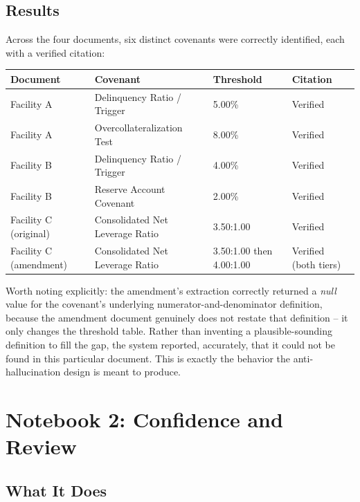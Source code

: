\documentclass[11pt,a4paper]{article}
\begin{document}
\subsection{Results}

Across the four documents, six distinct covenants were correctly identified, each with a verified citation:

\begin{center}
\renewcommand{\arraystretch}{1.3}
\begin{tabular}{@{}p{2.6cm}p{5.4cm}p{2.4cm}p{2.4cm}@{}}
\toprule
\textbf{Document} & \textbf{Covenant} & \textbf{Threshold} & \textbf{Citation} \\
\midrule
Facility A & Delinquency Ratio / Trigger & 5.00\% & Verified \\
Facility A & Overcollateralization Test & 8.00\% & Verified \\
Facility B & Delinquency Ratio / Trigger & 4.00\% & Verified \\
Facility B & Reserve Account Covenant & 2.00\% & Verified \\
Facility C (original) & Consolidated Net Leverage Ratio & 3.50:1.00 & Verified \\
Facility C (amendment) & Consolidated Net Leverage Ratio & 3.50:1.00 then 4.00:1.00 & Verified (both tiers) \\
\bottomrule
\end{tabular}
\end{center}

Worth noting explicitly: the amendment's extraction correctly returned a \emph{null} value for the covenant's underlying numerator-and-denominator definition, because the amendment document genuinely does not restate that definition -- it only changes the threshold table. Rather than inventing a plausible-sounding definition to fill the gap, the system reported, accurately, that it could not be found in this particular document. This is exactly the behavior the anti-hallucination design is meant to produce.

\newpage
\section{Notebook 2: Confidence and Review}

\subsection{What It Does}
\end{document}
